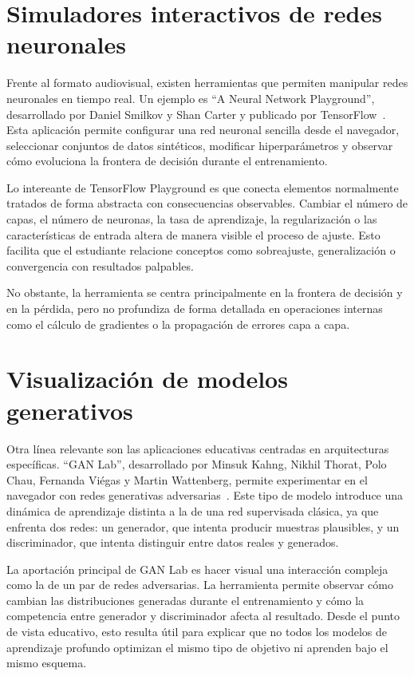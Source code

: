 \section{Simuladores interactivos de redes neuronales}
\label{sec:sota_simuladores_interactivos}

Frente al formato audiovisual, existen herramientas que permiten manipular redes neuronales en tiempo real.
Un ejemplo es ``A Neural Network Playground'', desarrollado por Daniel Smilkov y Shan Carter y publicado por TensorFlow~\cite{TensorFlowPlayground}.
Esta aplicación permite configurar una red neuronal sencilla desde el navegador, seleccionar conjuntos de datos sintéticos, modificar hiperparámetros y observar cómo evoluciona la frontera de decisión durante el entrenamiento.

Lo intereante de TensorFlow Playground es que conecta elementos normalmente tratados de forma abstracta con consecuencias observables.
Cambiar el número de capas, el número de neuronas, la tasa de aprendizaje, la regularización o las características de entrada altera de manera visible el proceso de ajuste.
Esto facilita que el estudiante relacione conceptos como sobreajuste, generalización o convergencia con resultados palpables.

No obstante, la herramienta se centra principalmente en la frontera de decisión y en la pérdida, pero no profundiza de forma detallada en operaciones internas como el cálculo de gradientes o la propagación de errores capa a capa.

\section{Visualización de modelos generativos}
\label{sec:sota_modelos_generativos}

Otra línea relevante son las aplicaciones educativas centradas en arquitecturas específicas.
``GAN Lab'', desarrollado por Minsuk Kahng, Nikhil Thorat, Polo Chau, Fernanda Viégas y Martin Wattenberg, permite experimentar en el navegador con redes generativas adversarias~\cite{GANLab}.
Este tipo de modelo introduce una dinámica de aprendizaje distinta a la de una red supervisada clásica, ya que enfrenta dos redes: un generador, que intenta producir muestras plausibles, y un discriminador, que intenta distinguir entre datos reales y generados.

La aportación principal de GAN Lab es hacer visual una interacción compleja como la de un par de redes adversarias.
La herramienta permite observar cómo cambian las distribuciones generadas durante el entrenamiento y cómo la competencia entre generador y discriminador afecta al resultado.
Desde el punto de vista educativo, esto resulta útil para explicar que no todos los modelos de aprendizaje profundo optimizan el mismo tipo de objetivo ni aprenden bajo el mismo esquema.

